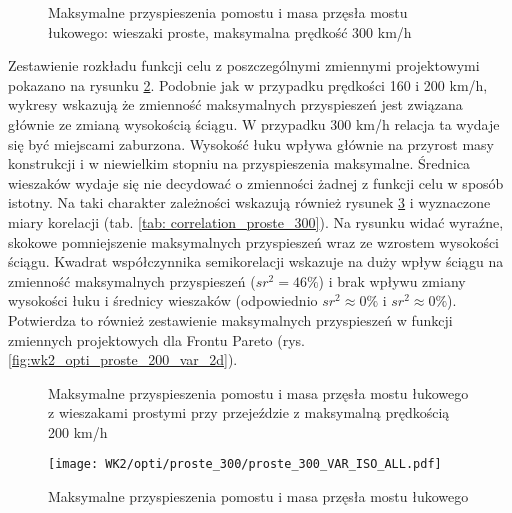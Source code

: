 \begin{figure}[hbt!]
	\centering
	\captionsetup{justification=centering}
	\caption{Maksymalne przyspieszenia pomostu i masa przęsła mostu łukowego: wieszaki proste, maksymalna prędkość 300 km/h}
	\label{fig:wk2_opti_proste_300_all}
\end{figure}

Zestawienie rozkładu funkcji celu z poszczególnymi zmiennymi projektowymi pokazano na rysunku \ref{fig:wk2_opti_proste_300_variables}. Podobnie jak w przypadku prędkości 160 i 200 km/h, wykresy wskazują że zmienność maksymalnych przyspieszeń jest związana głównie ze zmianą wysokością ściągu. W przypadku 300 km/h relacja ta wydaje się być miejscami zaburzona. Wysokość łuku wpływa głównie na przyrost masy konstrukcji i w niewielkim stopniu na przyspieszenia maksymalne. Średnica wieszaków wydaje się nie decydować o zmienności żadnej z funkcji celu w sposób istotny. Na taki charakter zależności wskazują również rysunek \ref{fig:wk2_opti_proste_300_vars_all} i wyznaczone miary korelacji (tab. \ref{tab: correlation_proste_300}). Na rysunku widać wyraźne, skokowe pomniejszenie maksymalnych przyspieszeń wraz ze wzrostem wysokości ściągu. Kwadrat współczynnika semikorelacji wskazuje na duży wpływ ściągu na zmienność maksymalnych przyspieszeń ($sr^2=46\%$) i brak wpływu zmiany wysokości łuku i średnicy wieszaków (odpowiednio $sr^2\approx 0\%$ i $sr^2\approx 0\%$). Potwierdza to również zestawienie maksymalnych przyspieszeń w funkcji zmiennych projektowych dla Frontu Pareto (rys. \ref{fig:wk2_opti_proste_200_var_2d}). 

\begin{figure}[hbt!]
	\centering
	\captionsetup{justification=centering}
	\caption{Maksymalne przyspieszenia pomostu i masa przęsła mostu łukowego z wieszakami prostymi przy przejeździe z maksymalną prędkością 200 km/h}
	\label{fig:wk2_opti_proste_300_variables}
\end{figure}
\begin{figure}[hbt!]
	\centering
	\texttt{[image: WK2/opti/proste\_300/proste\_300\_VAR\_ISO\_ALL.pdf]}
	\captionsetup{justification=centering}
	\caption{Maksymalne przyspieszenia pomostu i masa przęsła mostu łukowego }
	\label{fig:wk2_opti_proste_300_vars_all}
\end{figure}

